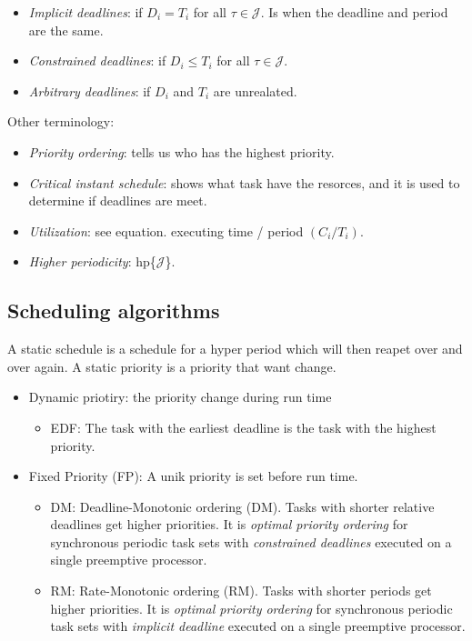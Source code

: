 \begin{itemize}
  \item \textit{Implicit deadlines}: if $D_i = T_i$ for all $\tau\in\mathcal{J}$. Is when the deadline and period are the same.
  \item \textit{Constrained deadlines}: if $D_i \leq T_i$ for all $\tau\in\mathcal{J}$.
  \item \textit{Arbitrary deadlines}: if $D_i$ and $T_i$ are unrealated.
\end{itemize}
 
Other terminology:
\begin{itemize}
  \item \textit{Priority ordering}: tells us who has the highest priority.
  \item \textit{Critical instant schedule}: shows what task have the resorces, and it is used to determine if deadlines are meet.
  \item \textit{Utilization}: see equation. executing time / period $ (C_i / T_i)$.
  \item \textit{Higher periodicity}: hp\{$\mathcal{J}$\}.
\end{itemize}


\subsection{Scheduling algorithms}
A static schedule is a schedule for a hyper period which will then reapet over and over again. A static priority is a priority that want change.
\begin{itemize}
  \item Dynamic priotiry: the priority change during run time
  \begin{itemize}
     \item EDF: The task with the earliest deadline is the task with the highest priority. 
  \end{itemize}
  \item Fixed Priority (FP): A unik priority is set before run time. 
  \begin{itemize}
     \item DM: Deadline-Monotonic ordering (DM). Tasks with shorter relative deadlines get higher priorities. It is \textit{optimal priority ordering} for synchronous periodic task sets with \textit{constrained deadlines} executed on a single preemptive processor.
     \item RM: Rate-Monotonic ordering (RM). Tasks with shorter periods get higher priorities. It is \textit{optimal priority ordering} for synchronous periodic task sets with \textit{implicit deadline} executed on a single preemptive processor.
  \end{itemize}
\end{itemize}

